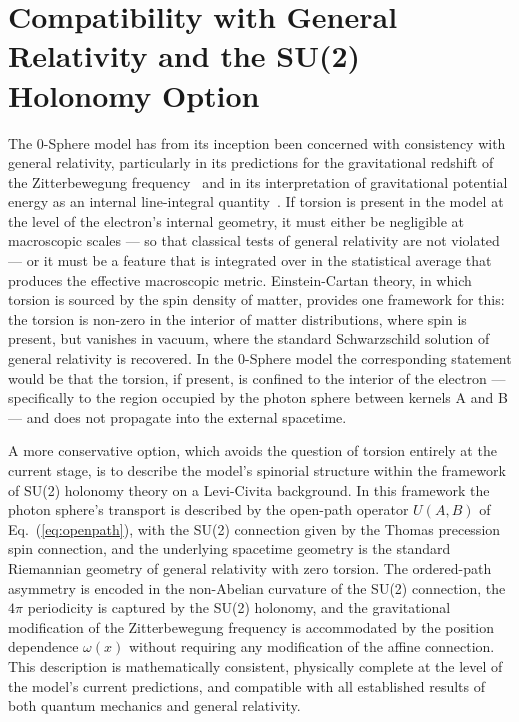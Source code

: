 \documentclass[%
 reprint,
 amsmath,amssymb,
 aps,
 prb,
]{revtex4-2}
\numberwithin{equation}{section}
\newcommand{\omeff}{\omega(x)}
\newcommand{\UAB}{U(A,B)}
\begin{document}
\section{Compatibility with General Relativity and the SU(2) Holonomy Option}
\label{sec:gr}

The 0-Sphere model has from its inception been concerned with consistency with general relativity, particularly in its predictions for the gravitational redshift of the Zitterbewegung frequency~\cite{paper22} and in its interpretation of gravitational potential energy as an internal line-integral quantity~\cite{paper37}. If torsion is present in the model at the level of the electron's internal geometry, it must either be negligible at macroscopic scales --- so that classical tests of general relativity are not violated --- or it must be a feature that is integrated over in the statistical average that produces the effective macroscopic metric. Einstein-Cartan theory, in which torsion is sourced by the spin density of matter, provides one framework for this: the torsion is non-zero in the interior of matter distributions, where spin is present, but vanishes in vacuum, where the standard Schwarzschild solution of general relativity is recovered. In the 0-Sphere model the corresponding statement would be that the torsion, if present, is confined to the interior of the electron --- specifically to the region occupied by the photon sphere between kernels A and B --- and does not propagate into the external spacetime.

A more conservative option, which avoids the question of torsion entirely at the current stage, is to describe the model's spinorial structure within the framework of SU(2) holonomy theory on a Levi-Civita background. In this framework the photon sphere's transport is described by the open-path operator $\UAB$ of Eq.~(\ref{eq:openpath}), with the SU(2) connection given by the Thomas precession spin connection, and the underlying spacetime geometry is the standard Riemannian geometry of general relativity with zero torsion. The ordered-path asymmetry is encoded in the non-Abelian curvature of the SU(2) connection, the $4\pi$ periodicity is captured by the SU(2) holonomy, and the gravitational modification of the Zitterbewegung frequency is accommodated by the position dependence $\omeff$ without requiring any modification of the affine connection. This description is mathematically consistent, physically complete at the level of the model's current predictions, and compatible with all established results of both quantum mechanics and general relativity.
\end{document}
